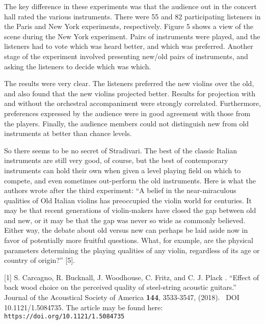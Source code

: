   The key difference in these experiments was that the audience out in the 
  concert hall rated the various instruments. There were 55 and 82 
  participating listeners in the Paris and New York experiments, respectively. 
  Figure 5 shows a view of the scene during the New York experiment. Pairs of 
  instruments were played, and the listeners had to vote which was heard 
  better, and which was preferred. Another stage of the experiment involved 
  presenting new/old pairs of instruments, and asking the listeners to decide 
  which was which. 


  The results were very clear. The listeners preferred the new violins over the 
  old, and also found that the new violins projected better. Results for 
  projection with and without the orchestral accompaniment were strongly 
  correlated. Furthermore, preferences expressed by the audience were in good 
  agreement with those from the players. Finally, the audience members could 
  not distinguish new from old instruments at better than chance levels. 

  So there seems to be no secret of Stradivari. The best of the classic Italian 
  instruments are still very good, of course, but the best of contemporary 
  instruments can hold their own when given a level playing field on which to 
  compete, and even sometimes out-perform the old instruments. Here is what the 
  authors wrote after the third experiment: “A belief in the near-miraculous 
  qualities of Old Italian violins has preoccupied the violin world for 
  centuries. It may be that recent generations of violin-makers have closed the 
  gap between old and new, or it may be that the gap was never so wide as 
  commonly believed. Either way, the debate about old versus new can perhaps be 
  laid aside now in favor of potentially more fruitful questions. What, for 
  example, are the physical parameters determining the playing qualities of any 
  violin, regardless of its age or country of origin?” [5]. 



  \sectionreferences{}[1] S. Carcagno, R. Bucknall, J. Woodhouse, C. Fritz, and 
  C. J. Plack . ``Effect of back wood choice on the perceived quality of 
  steel-string acoustic guitars.'' Journal of the Acoustical Society of America 
  \textbf{144}, 3533-3547, (2018).~ DOI 10.1121/1.5084735. The article may be 
  found here: \tt{}https://doi.org/10.1121/1.5084735\rm{} 

